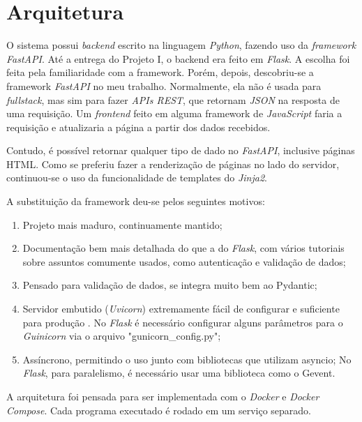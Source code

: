\chapter{Arquitetura}

O sistema possui \textit{backend} escrito na linguagem \textit{Python}, 
fazendo uso da 
\textit{framework \textit{FastAPI}}. Até a entrega do Projeto I, o backend era feito em \textit{Flask}. 
A escolha foi feita pela familiaridade com a framework. Porém, depois, 
descobriu-se a framework \textit{FastAPI} no meu trabalho. Normalmente, ela não é usada para 
\textit{fullstack}, mas sim para fazer \textit{APIs REST}, que retornam \textit{JSON} na resposta de uma 
requisição. Um \textit{frontend} feito em alguma framework de \textit{JavaScript} faria a requisição
 e atualizaria a página a partir dos dados recebidos.

Contudo, é possível retornar qualquer tipo de dado no \textit{\textit{FastAPI}}, inclusive páginas 
HTML. Como se preferiu fazer a renderização de páginas no lado do servidor, continuou-se
o uso da funcionalidade de templates do \textit{\textit{Jinja2}}.

A substituição da framework deu-se pelos seguintes motivos:

\begin{enumerate}
\item Projeto mais maduro, continuamente mantido;
\item Documentação bem mais detalhada do que a do \textit{Flask}, com vários tutoriais sobre assuntos comumente usados, como autenticação e validação de dados;
\item Pensado para validação de dados, se integra muito bem ao Pydantic;
\item Servidor embutido (\textit{\textit{Uvicorn}}) extremamente fácil de configurar e suficiente para produção \cite{fast-api-prod}.
No \textit{Flask} é necessário configurar alguns parâmetros para o \textit{Guinicorn} via o arquivo "gunicorn\_config.py";
\item Assíncrono, permitindo o uso junto com bibliotecas que utilizam asyncio;
No \textit{Flask}, para paralelismo, é necessário usar uma biblioteca como o Gevent.
\end{enumerate}

A arquitetura foi pensada para ser implementada com o \textit{\textit{Docker}} e \textit{\textit{Docker} Compose}. Cada
programa executado é rodado em um serviço separado.

